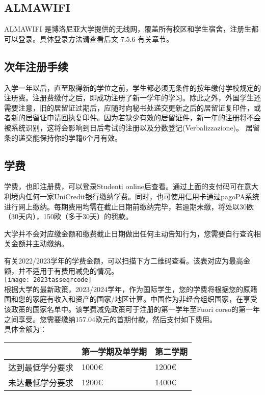 \subsection{ALMAWIFI}
ALMAWIFI 是博洛尼亚大学提供的无线网，覆盖所有校区和学生宿舍，注册生都可以登录。具体登录方法请查看后文 7.5.6 有关章节。

\subsection{次年注册手续}
入学一年以后，直至取得新的学位之前，学生都必须无条件的按年缴付学校规定的注册费。注册费缴付之后，即成功注册了新一学年的学习。除此之外，外国学生还需要注意，旧的居留证过期后，应随时向秘书处递交更新之后的居留证复印件，或者新的居留证申请回执复印件。因为若缺少有效的居留证件，新一年的注册将不会被系统识别，这将会影响到日后考试的注册以及分数登记(Verbalizzazione)。 居留条的递交能保持你的学籍6个月有效。

\subsection{学费}
学费，也即注册费，可以登录Studenti online后查看。通过上面的支付码可在意大利境内任何一家UniCredit银行缴纳学费。同时，也可使用信用卡通过pagoPA系统进行网上缴纳。每期费用均需在截止日期前缴纳完毕，若逾期未缴，将处以30欧（30天内），150欧（多于30天）的罚款。 

大学并不会对应缴金额和缴费截止日期做出任何主动告知行为，您需要自行查询相关金额并主动缴纳。

有关2022/2023学年的学费金额，可以扫描下方二维码查看。该表对应为最高金额，并不适用于有费用减免的情况。\\

\texttt{[image: 2023tasseqrcode]}\\

根据大学的最新政策，2023/2024学年，作为国际学生，您的学费将根据您的原籍国和您的家庭有收入和资产的国家/地区计算。中国作为非经合组织国家，在享受该政策的国家名单中。该学费减免政策可于注册的第一学年至Fuori corso的第一年之间享受。您需要缴纳157.04欧元的首期付款，然后支付如下费用。\\
具体金额为：\\
\begin{tabularx}{\textwidth}{ |X|X|X| }
  \hline
   & 第一学期及单学期 & 第二学期\\
  \hline 
  达到最低学分要求  & 1000€ & 1200€  \\
  \hline 
  未达最低学分要求  & 1200€ & 1400€  \\
  \hline
\end{tabularx}


